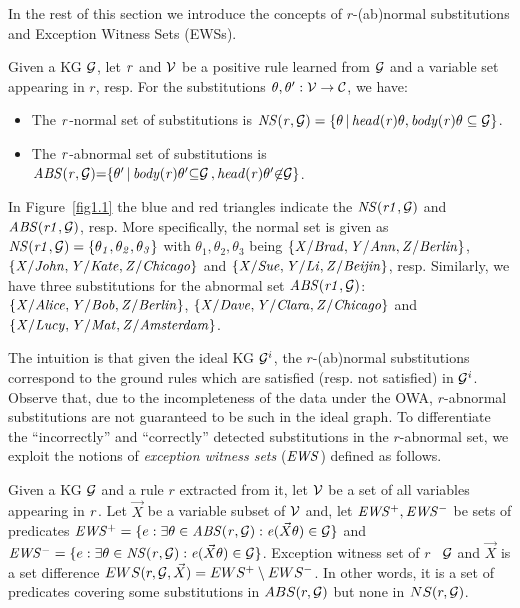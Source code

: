 In the rest of this section we introduce the concepts of $r$-(ab)normal substitutions and Exception Witness Sets (EWSs).

\begin{definition}\label{sec:rulelearn}
Given a KG $\mathcal{G}$, let $\mathit{r}$ and $\mathcal{V}$ be a positive rule learned from $\mathcal{G}$ and a variable set appearing in $r$, resp. For the substitutions $\theta,\theta':\mathcal{V} \rightarrow \mathcal{C}$, we have:

\begin{itemize}
\item The $\mathit{r}$-normal set of substitutions is $\mathit{NS(r, \mathcal{G})=\{\theta\, |\, head(r)\theta,body(r)\theta \subseteq \mathcal{G}\}}$.
\item The $\mathit{r}$-abnormal set of substitutions is $\mathit{ABS(r, \mathcal{G}){=}\{\theta'\, |\, body(r)\theta'} \mathit{{\subseteq} \mathcal{G}\,{,}\,head(r)\theta' {\not \in} \mathcal{G}\}}$.
\end{itemize}
\end{definition}

\begin{example}\label{ex:abns}
In Figure~\ref{fig1.1} the blue and red triangles indicate the $\mathit{NS(r1,\mathcal{G})}$ and $\mathit{ABS(r1,\mathcal{G})}$, resp. More specifically, the normal set is given as $\mathit{NS(r1,\mathcal{G})}=\{\mathit{\theta_1,\theta_2,\theta_3}\}$ with $\theta_1,\theta_2,\theta_3$ being $\{\mathit{X/Brad,Y/Ann,Z/Berlin}\}$, $\{\mathit{X/John,Y/Kate,Z/Chicago}\}$ and $\{\mathit{X/Sue,Y/Li,Z/Beijin}\}$, resp. Similarly, we have three substitutions for the abnormal set $\mathit{ABS(r1,\mathcal{G})}$: $\{\mathit{X/Alice,Y/Bob,Z/Berlin}\}$, $\{\mathit{X/Dave,Y/Clara,Z/Chicago}\}$ and $\{\mathit{X/Lucy,Y/Mat,Z/Amsterdam}\}$.
\end{example}

The intuition is that given the ideal KG $\mathcal{G}^i$, the $r$-(ab)normal substitutions correspond to the ground rules which are satisfied (resp. not satisfied) in $\mathcal{G}^i$. Observe that, due to the incompleteness of the data under the OWA, $r$-abnormal substitutions are not guaranteed to be such in the ideal graph. To differentiate the ``incorrectly'' and ``correctly'' detected substitutions in the $r$-abnormal set, we exploit the notions of \emph{exception witness sets} ($\mathit{EWS}$) defined as follows.

\begin{definition} \label{def:ews}
Given a KG $\mathcal{G}$ and a rule $r$ extracted from it, let $\mathcal{V}$ be a set of all variables appearing in $\mathit{r}$. Let $\vec{X}$ be a variable subset of $\mathcal{V}$ and, let $\mathit{EWS^+, EWS^-}$ be sets of predicates $\mathit{EWS^+}=\{e: \exists \theta \in \mathit{ABS(r,\mathcal{G})}: \mathit{e}(\vec{X}\theta)\in \mathcal{G}\}$ and $\mathit{EWS^-}=\{e: \exists \theta \in \mathit{NS(r,\mathcal{G})}: \mathit{e}(\vec{X}\theta)\in \mathcal{G}\}$. Exception witness set of $r$ \wrt\ $\mathcal{G}$ and $\vec{X}$ is a set difference $EWS(r,\mathcal{G},\vec{X})=EWS^+ \setminus EWS^-$. In other words, it is a set of predicates covering some substitutions in $ABS(r, \mathcal{G})$ but none in $NS(r, \mathcal{G})$.
\end{definition}

